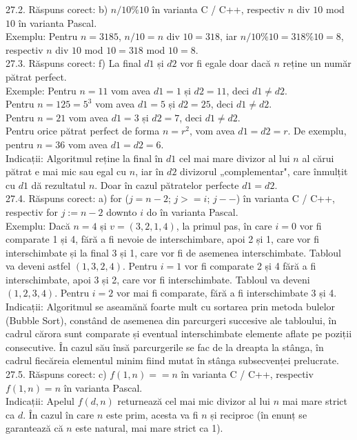 27.2. Răspuns corect: b) $n / 10 \% 10$ în varianta C / C++, respectiv $n$ div $10$ mod $10$ în varianta Pascal.\\
Exemplu: Pentru $n=3185$, $n / 10=n$ div $10=318$, iar $n / 10 \% 10=318 \% 10=8$, respectiv $n$ div $10$ mod $10=318$ mod $10=8$.\\

27.3. Răspuns corect: f) La final $d1$ și $d2$ vor fi egale doar dacă $n$ reține un număr pătrat perfect.\\
Exemple: Pentru $n=11$ vom avea $d1=1$ și $d2=11$, deci $d1 \neq d2$.\\ Pentru $n=125=5^{3}$ vom avea $d1=5$ și $d2=25$, deci $d1 \neq d2$.\\ Pentru $n=21$ vom avea $d1=3$ și $d2=7$, deci $d1 \neq d2$.\\ Pentru orice pătrat perfect de forma $n=r^{2}$, vom avea $d1=d2=r$. De exemplu, pentru $n=36$ vom avea $d1=d2=6$.\\ Indicații: Algoritmul reține la final în $d1$ cel mai mare divizor al lui $n$ al cărui pătrat e mai mic sau egal cu $n$, iar în $d2$ divizorul „complementar", care înmulțit cu $d1$ dă rezultatul $n$. Doar în cazul pătratelor perfecte $d1=d2$.\\

27.4. Răspuns corect: a) for ($j=n-2$; $j>=i$; $j--$) în varianta C / C++, respectiv for $j:=n-2$ downto $i$ do în varianta Pascal.\\
Exemplu: Dacă $n=4$ și $v=(3,2,1,4)$, la primul pas, în care $i=0$ vor fi comparate 1 și 4, fără a fi nevoie de interschimbare, apoi 2 și 1, care vor fi interschimbate și la final 3 și 1, care vor fi de asemenea interschimbate. Tabloul va deveni astfel $(1,3,2,4)$. Pentru $i=1$ vor fi comparate 2 și 4 fără a fi interschimbate, apoi 3 și 2, care vor fi interschimbate. Tabloul va deveni $(1,2,3,4)$. Pentru $i=2$ vor mai fi comparate, fără a fi interschimbate 3 și 4.\\ Indicații: Algoritmul se aseamănă foarte mult cu sortarea prin metoda bulelor (Bubble Sort), constând de asemenea din parcurgeri succesive ale tabloului, în cadrul cărora sunt comparate și eventual interschimbate elemente aflate pe poziții consecutive. În cazul său însă parcurgerile se fac de la dreapta la stânga, în cadrul fiecăreia elementul minim fiind mutat în stânga subsecvenței prelucrate.\\

27.5. Răspuns corect: c) $f(1, n)==n$ în varianta C / C++, respectiv $f(1, n)=n$ în varianta Pascal.\\
Indicații: Apelul $f(d, n)$ returnează cel mai mic divizor al lui $n$ mai mare strict ca $d$. În cazul în care $n$ este prim, acesta va fi $n$ și reciproc (în enunț se garantează că $n$ este natural, mai mare strict ca 1).\\

